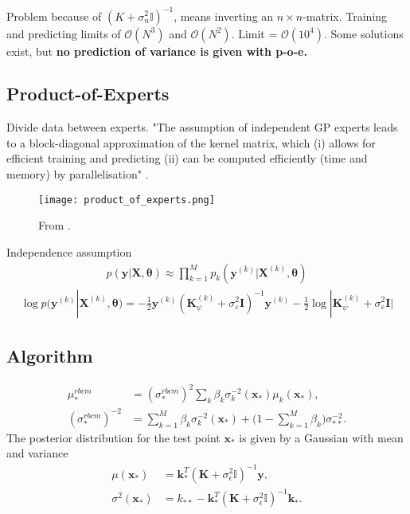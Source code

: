 \documentclass[twoside,english]{uiofysmaster}
\begin{document}
Problem because of $(K + \sigma_n^2 \mathbb{I})^{-1}$, means inverting an $n \times n$-matrix. Training and predicting limits of $\mathcal{O}(N^3)$ and $\mathcal{O}(N^2)$. Limit = $\mathcal{O}(10^4)$. Some solutions exist, but \textbf{no prediction of variance is given with p-o-e.}

\subsection{Product-of-Experts}

Divide data between experts. "The assumption of independent GP experts leads to a
block-diagonal approximation of the kernel matrix, which
(i) allows for efficient training and predicting (ii) can be
computed efficiently (time and memory) by parallelisation" \cite{deisenroth2015distributed}.

\begin{figure}
\centering
\texttt{[image: product\_of\_experts.png]}
\caption{From \cite{deisenroth2015distributed}.}
\end{figure}

Independence assumption
\begin{align}
p(\textbf{y} | \textbf{X}, \boldsymbol{\theta}) \approx \prod_{k=1}^M p_k(\textbf{y}^{(k)} | \textbf{X}^{(k)}, \boldsymbol{\theta}) 
\end{align}
\begin{align}
\log p(\textbf{y}^{(k)}|\textbf{X}^{(k)}, \boldsymbol{\theta}) = - \frac{1}{2} \textbf{y}^{(k)} (\textbf{K}_{\psi}^{(k)} + \sigma_{\varepsilon}^2 \textbf{I})^{-1}\textbf{y}^{(k)} - \frac{1}{2} \log
 |\textbf{K}_{\psi}^{(k)} + \sigma_{\varepsilon}^2 \textbf{I} |
\end{align}


\subsection{Algorithm}

\begin{align}
\mu_*^{rbcm} &= (\sigma_*^{rbcm})^2 \sum_k \beta_k \sigma_k^{-2} (\textbf{x}_*) \mu_k (\textbf{x}_*),\\
(\sigma_*^{rbcm})^{-2} &= \sum_{k=1}^M \beta_k \sigma_k^{-2} (\textbf{x}_*) + \big(1 - \sum_{k=1}^M \beta_k \big) \sigma_{**}^{-2}.
\end{align}
The posterior distribution for the test point $\textbf{x}_*$ is given by a Gaussian with mean and variance
\begin{align}
\mu (\textbf{x}_*) &= \textbf{k}_*^T (\textbf{K} + \sigma_{\epsilon}^2 \mathbb{I})^{-1} \textbf{y},\\
\sigma^2(\textbf{x}_*) &= k_{**} - \textbf{k}_*^T(\textbf{K} + \sigma_{\epsilon}^2 \mathbb{I})^{-1} \textbf{k}_*.
\end{align}
\end{document}
